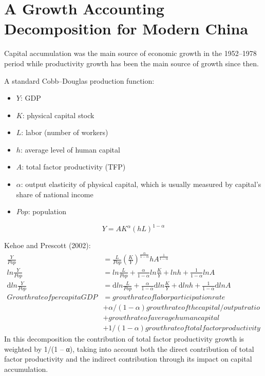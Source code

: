 \documentclass{article}
\begin{document}
    \section*{A Growth Accounting Decomposition for Modern China}
    Capital accumulation was the main source of economic growth in the 1952–1978 period while productivity growth has been the main source of growth since then.

    A standard Cobb–Douglas production function:
    \begin{itemize}
        \item $Y$: GDP
        \item $K$: physical capital stock
        \item $L$: labor (number of workers)
        \item $h$: average level of human capital
        \item $A$: total factor productivity (TFP)
        \item $\alpha$: output elasticity of physical capital, which is usually measured by capital’s share of national income
        \item $Pop$: population
    \end{itemize}
    \begin{equation*}
        Y=AK^\alpha(hL)^{1-\alpha}
    \end{equation*}

    Kehoe and Prescott (2002):
    \begin{align*}
        \frac{Y}{Pop}&=\frac{L}{Pop}(\frac{K}{Y})^{\frac{\alpha}{1-\alpha}}hA^{\frac{1}{1-\alpha}}\\
        ln\frac{Y}{Pop}&=ln\frac{L}{Pop}+\frac{\alpha}{1-\alpha}ln\frac{K}{Y}+lnh+\frac{1}{1-\alpha}lnA\\
        \mathrm{d} ln\frac{Y}{Pop}&=\mathrm{d} ln\frac{L}{Pop}+\frac{\alpha}{1-\alpha} \mathrm{d} ln\frac{K}{Y}+ \mathrm{d} lnh+\frac{1}{1-\alpha} \mathrm{d} lnA\\
        Growth rate of per capita GDP&=growth rate of labor participation rate\\
        &+\alpha/(1-\alpha)growth rate of the capital/output ratio\\
        &+growth rate of average human capital\\
        &+1/(1-\alpha)growth rate of total factor productivity
    \end{align*}
    In this decomposition the contribution of total factor productivity growth is weighted by 1/(1 – α), taking into account both the direct contribution of total factor productivity and the indirect contribution through its impact on capital accumulation.
\end{document}
